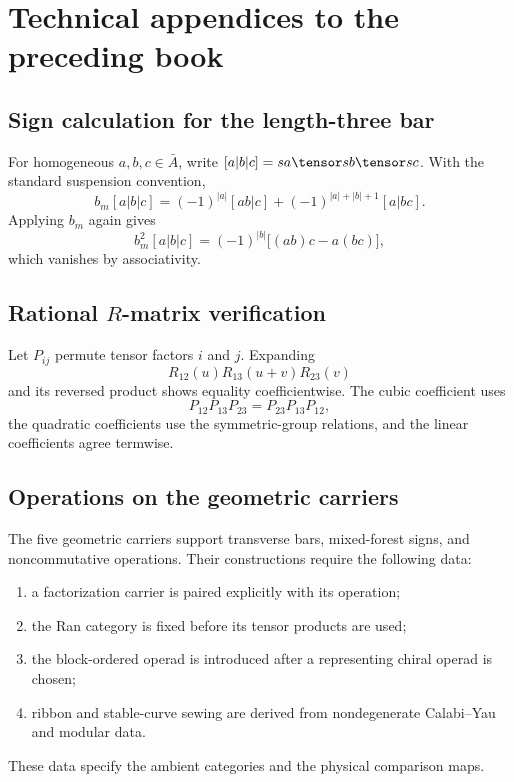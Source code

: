 \part{Technical appendices to the preceding book}
\chapter{Sign calculation for the length-three bar}
For homogeneous $a,b,c\in\bar A$, write $[a|b|c]=sa\tensor sb\tensor sc$. With the standard suspension convention,
\[
 b_m[a|b|c]
 =(-1)^{|a|}[ab|c]
 +(-1)^{|a|+|b|+1}[a|bc].
\]
Applying $b_m$ again gives
\[
 b_m^2[a|b|c]
 =(-1)^{|b|}\bigl[(ab)c-a(bc)\bigr],
\]
which vanishes by associativity.

\chapter{Rational \texorpdfstring{$R$}{R}-matrix verification}
Let $P_{ij}$ permute tensor factors $i$ and $j$. Expanding
\[
 R_{12}(u)R_{13}(u+v)R_{23}(v)
\]
and its reversed product shows equality coefficientwise. The cubic coefficient uses
\[
 P_{12}P_{13}P_{23}=P_{23}P_{13}P_{12},
\]
the quadratic coefficients use the symmetric-group relations, and the linear coefficients agree termwise.

\chapter{Operations on the geometric carriers}
The five geometric carriers support transverse bars, mixed-forest signs, and noncommutative operations. Their constructions require the following data:
\begin{enumerate}
\item a factorization carrier is paired explicitly with its operation;
\item the Ran category is fixed before its tensor products are used;
\item the block-ordered operad is introduced after a representing chiral operad is chosen;
\item ribbon and stable-curve sewing are derived from nondegenerate Calabi--Yau and modular data.
\end{enumerate}
These data specify the ambient categories and the physical comparison maps.
